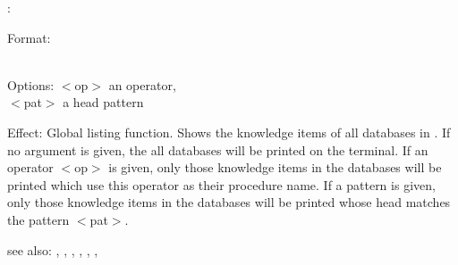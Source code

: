 \listing:

Format: \\
        \\

Options: $<$op$>$ an operator,\\
         $<$pat$>$ a head pattern

Effect: Global listing function. Shows the knowledge items of all databases in
	\COLAB. If no argument is given, the all databases will be printed on
	the terminal. If an operator $<$op$>$ is given, only those knowledge items
	in the databases will be printed which use this operator as their 
	procedure name. If a pattern is given, only those knowledge items in the
	databases will be printed whose head matches the pattern $<$pat$>$.


see also: , , , , , , 
	  \consult
